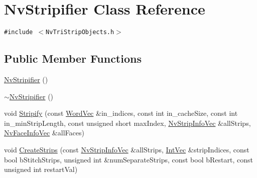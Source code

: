 \hypertarget{class_nv_stripifier}{
\section{NvStripifier Class Reference}
\label{class_nv_stripifier}
}
{\tt \#include $<$NvTriStripObjects.h$>$}

\subsection*{Public Member Functions}
\begin{CompactItemize}
\item 
\hyperlink{class_nv_stripifier_f7658997932c8c1affe3b0c133cc196b}{NvStripifier} ()
\item 
\hyperlink{class_nv_stripifier_d01fb24dcd9da70c006e99e553545b4c}{$\sim$NvStripifier} ()
\item 
void \hyperlink{class_nv_stripifier_aac47bf929630e54c53427fb1714816d}{Stripify} (const \hyperlink{_nv_tri_strip_objects_8h_0e4014090627df01c862364a6acc4020}{WordVec} \&in\_\-indices, const int in\_\-cacheSize, const int in\_\-minStripLength, const unsigned short maxIndex, \hyperlink{_nv_tri_strip_objects_8h_83f9ba7bd0288dc93c5eed20e7f61170}{NvStripInfoVec} \&allStrips, \hyperlink{_nv_tri_strip_objects_8h_93d0a2f26991e801145908bc4d3d9156}{NvFaceInfoVec} \&allFaces)
\item 
void \hyperlink{class_nv_stripifier_089482ef9c1cab8f595bf51cae36555d}{CreateStrips} (const \hyperlink{_nv_tri_strip_objects_8h_83f9ba7bd0288dc93c5eed20e7f61170}{NvStripInfoVec} \&allStrips, \hyperlink{_nv_tri_strip_objects_8h_4c42bc5fa9b3648755b0148698307573}{IntVec} \&stripIndices, const bool bStitchStrips, unsigned int \&numSeparateStrips, const bool bRestart, const unsigned int restartVal)
\end{CompactItemize}
